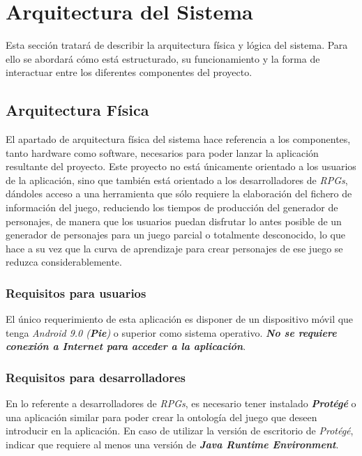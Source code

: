 
\section{Arquitectura del Sistema}
Esta sección tratará de describir la arquitectura física y lógica del sistema. Para ello se abordará cómo 
está estructurado, su funcionamiento y la forma de interactuar entre los diferentes componentes del 
proyecto.

\subsection{Arquitectura Física}
El apartado de arquitectura física del sistema hace referencia a los componentes, tanto hardware como software,
necesarios para poder lanzar la aplicación resultante del proyecto. Este proyecto no está únicamente orientado 
a los usuarios de la aplicación, sino que también está orientado a los desarrolladores de \textit{RPGs}, dándoles acceso
a una herramienta que sólo requiere la elaboración del fichero de información del juego, reduciendo los tiempos de 
producción del generador de personajes, de manera que los usuarios puedan disfrutar lo antes posible de un generador 
de personajes para un juego parcial o totalmente desconocido, lo que hace a su vez que la curva de aprendizaje para 
crear personajes de ese juego se reduzca considerablemente.

\subsubsection{Requisitos para usuarios}
El único requerimiento de esta aplicación es disponer de un dispositivo móvil que tenga 
\textit{Android 9.0 (\textbf{Pie})} o superior como sistema operativo.
\textit{\textbf{No se requiere conexión a Internet para acceder a la aplicación}}. 

\subsubsection{Requisitos para desarrolladores}
En lo referente a desarrolladores de \textit{RPGs}, es necesario tener instalado \textit{\textbf{Protégé}} o una aplicación
similar para poder crear la ontología del juego que deseen introducir en la aplicación. En caso de utilizar la versión de 
escritorio de \textit{Protégé}, indicar que requiere al menos una versión de \textit{\textbf{Java Runtime Environment}}.

